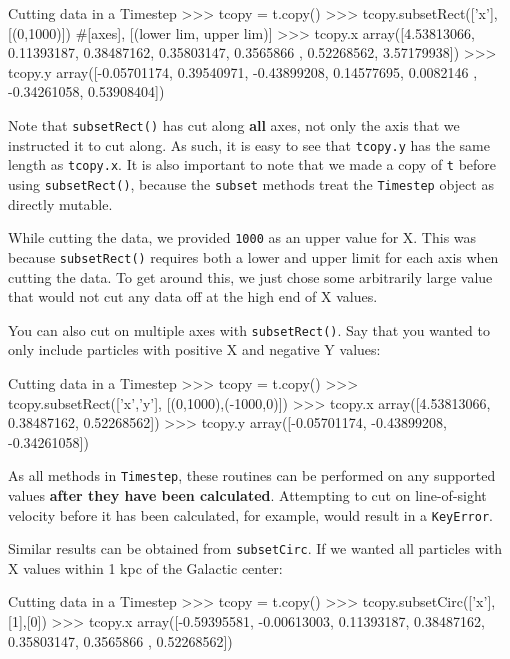 \documentclass{article}
\begin{document}
\begin{codelisting}{Cutting data in a Timestep}
>>> tcopy = t.copy()
>>> tcopy.subsetRect(['x'], [(0,1000)]) #[axes], [(lower lim, upper lim)]
>>> tcopy.x
array([4.53813066, 0.11393187, 0.38487162, 0.35803147, 0.3565866 ,
       0.52268562, 3.57179938])
>>> tcopy.y
array([-0.05701174,  0.39540971, -0.43899208,  0.14577695,  0.0082146 ,
       -0.34261058,  0.53908404])
\end{codelisting}

Note that \verb!subsetRect()! has cut along \textbf{all} axes, not only the axis that we instructed it to cut along. As such, it is easy to see that \verb!tcopy.y! has the same length as \verb!tcopy.x!. It is also important to note that we made a copy of \verb!t! before using \verb!subsetRect()!, because the \verb!subset! methods treat the \verb!Timestep! object as directly mutable. 

While cutting the data, we provided \verb!1000! as an upper value for X. This was because \verb!subsetRect()! requires both a lower and upper limit for each axis when cutting the data. To get around this, we just chose some arbitrarily large value that would not cut any data off at the high end of X values. 

You can also cut on multiple axes with \verb!subsetRect()!. Say that you wanted to only include particles with positive X and negative Y values: \\

\begin{codelisting}{Cutting data in a Timestep}
>>> tcopy = t.copy()
>>> tcopy.subsetRect(['x','y'], [(0,1000),(-1000,0)])
>>> tcopy.x
array([4.53813066, 0.38487162, 0.52268562])
>>> tcopy.y
array([-0.05701174, -0.43899208, -0.34261058])
\end{codelisting}

As all methods in \verb!Timestep!, these routines can be performed on any supported values \textbf{after they have been calculated}. Attempting to cut on line-of-sight velocity before it has been calculated, for example, would result in a \verb!KeyError!. 

Similar results can be obtained from \verb!subsetCirc!. If we wanted all particles with X values within 1 kpc of the Galactic center: \\

\begin{codelisting}{Cutting data in a Timestep}
>>> tcopy = t.copy()
>>> tcopy.subsetCirc(['x'],[1],[0])
>>> tcopy.x
array([-0.59395581, -0.00613003,  0.11393187,  0.38487162,  0.35803147,
        0.3565866 ,  0.52268562])
\end{codelisting}
\end{document}
